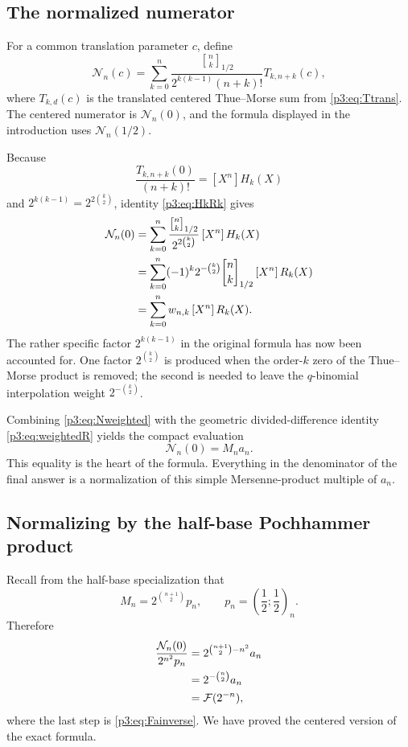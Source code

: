\documentclass[11pt,oneside]{article}
\theoremstyle{definition}
\theoremstyle{remark}
\newcommand{\qpoch}[3]{\left(#1;#2\right)_{#3}}
\newcommand{\halfqbinom}[2]{{\genfrac{[}{]}{0pt}{}{#1}{#2}}_{1/2}}
\newcommand{\F}{\mathcal F}
\newcommand{\coeff}[2]{\left[#1^{#2}\right]}
\begin{document}
\subsection{The normalized numerator}

For a common translation parameter $c$, define
\begin{equation}\label{p3:eq:Nncdef}
 \mathcal N_n(c)=
 \sum_{k=0}^{n}
 \frac{\halfqbinom{n}{k}}
      {2^{k(k-1)}(n+k)!}
 T_{k,n+k}(c),
\end{equation}
where $T_{k,d}(c)$ is the translated centered Thue--Morse sum from
\eqref{p3:eq:Ttrans}.  The centered numerator is $\mathcal N_n(0)$, and the
formula displayed in the introduction uses $\mathcal N_n(1/2)$.

Because
\[
 \frac{T_{k,n+k}(0)}{(n+k)!}=\coeff{X}{n}H_k(X)
\]
and $2^{k(k-1)}=2^{2\binom{k}{2}}$, identity
\eqref{p3:eq:HkRk} gives
\begin{align}
 \mathcal N_n(0)
 &=\sum_{k=0}^{n}
   \frac{\halfqbinom{n}{k}}{2^{2\binom{k}{2}}}
   \coeff{X}{n}H_k(X)\notag\\
 &=\sum_{k=0}^{n}
   (-1)^k2^{-\binom{k}{2}}\halfqbinom{n}{k}
   \coeff{X}{n}R_k(X)\notag\\
 &=\sum_{k=0}^{n}w_{n,k}\coeff{X}{n}R_k(X).\label{p3:eq:Nweighted}
\end{align}
The rather specific factor $2^{k(k-1)}$ in the original formula has now
been accounted for.  One factor $2^{\binom{k}{2}}$ is produced when the
order-$k$ zero of the Thue--Morse product is removed; the second is needed
to leave the $q$-binomial interpolation weight
$2^{-\binom{k}{2}}$.

Combining \eqref{p3:eq:Nweighted} with the geometric divided-difference
identity \eqref{p3:eq:weightedR} yields the compact evaluation
\begin{equation}\label{p3:eq:Ncenteredvalue}
 \boxed{\mathcal N_n(0)=M_na_n.}
\end{equation}
This equality is the heart of the formula.  Everything in the denominator
of the final answer is a normalization of this simple Mersenne-product
multiple of $a_n$.

\subsection{Normalizing by the half-base Pochhammer product}

Recall from the half-base specialization that
\begin{equation}\label{p3:eq:Mnpnagain}
 M_n=2^{\binom{n+1}{2}}p_n,
 \qquad p_n=\qpoch{\frac12}{\frac12}{n}.
\end{equation}
Therefore
\begin{align}
 \frac{\mathcal N_n(0)}{2^{n^2}p_n}
 &=2^{\binom{n+1}{2}-n^2}a_n\notag\\
 &=2^{-\binom n2}a_n\notag\\
 &=\F(2^{-n}),\label{p3:eq:normalizationfinish}
\end{align}
where the last step is \eqref{p3:eq:Fainverse}.  We have proved the centered
version of the exact formula.
\end{document}
